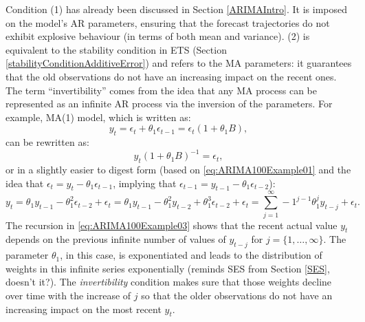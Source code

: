 \documentclass[
]{book}
\theoremstyle{definition}
\theoremstyle{definition}
\theoremstyle{definition}
\theoremstyle{definition}
\theoremstyle{remark}
\begin{document}
Condition (1) has already been discussed in Section \ref{ARIMAIntro}. It is imposed on the model's AR parameters, ensuring that the forecast trajectories do not exhibit explosive behaviour (in terms of both mean and variance). (2) is equivalent to the stability condition in ETS (Section \ref{stabilityConditionAdditiveError}) and refers to the MA parameters: it guarantees that the old observations do not have an increasing impact on the recent ones. The term ``invertibility'' comes from the idea that any MA process can be represented as an infinite AR process via the inversion of the parameters. For example, MA(1) model, which is written as:
\begin{equation}
  y_t = \epsilon_t + \theta_1 \epsilon_{t-1} = \epsilon_t (1 + \theta_1 B) ,
  \label{eq:ARIMA100Example01}
\end{equation}
can be rewritten as:
\begin{equation}
  y_t (1 + \theta_1 B)^{-1} = \epsilon_t,
  \label{eq:ARIMA100Example02}
\end{equation}
or in a slightly easier to digest form (based on \eqref{eq:ARIMA100Example01} and the idea that \(\epsilon_{t} = y_{t} -\theta_1 \epsilon_{t-1}\), implying that \(\epsilon_{t-1} = y_{t-1} -\theta_1 \epsilon_{t-2}\)):
\begin{equation}
  y_t = \theta_1 y_{t-1} -\theta_1^2 \epsilon_{t-2} + \epsilon_t = \theta_1 y_{t-1} -\theta_1^2 y_{t-2} + \theta_1^3 \epsilon_{t-2} + \epsilon_t = \sum_{j=1}^\infty -1^{j-1} \theta_1^j y_{t-j} + \epsilon_t.
  \label{eq:ARIMA100Example03}
\end{equation}
The recursion in \eqref{eq:ARIMA100Example03} shows that the recent actual value \(y_t\) depends on the previous infinite number of values of \(y_{t-j}\) for \(j=\{1,\dots,\infty\}\). The parameter \(\theta_1\), in this case, is exponentiated and leads to the distribution of weights in this infinite series exponentially (reminds SES from Section \ref{SES}, doesn't it?). The \emph{invertibility} condition makes sure that those weights decline over time with the increase of \(j\) so that the older observations do not have an increasing impact on the most recent \(y_t\).
\end{document}
